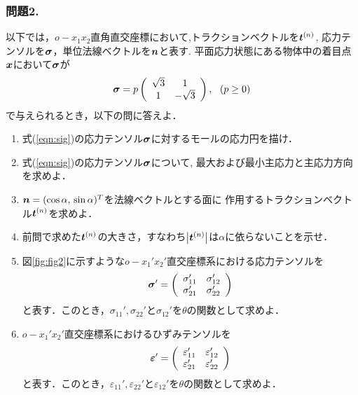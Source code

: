 \documentclass[10pt,a4j]{jarticle}
\begin{document}
\subsubsection*{問題2.}
以下では，$o-x_1x_2$直角直交座標において,トラクションベクトルを$\mbox{\boldmath $t$}^{(n)}$, 
応力テンソルを$\mbox{\boldmath $\sigma$}$，単位法線ベクトルを$\mbox{\boldmath $n$}$と表す.
平面応力状態にある物体中の着目点$\mbox{\boldmath $x$}$において$\mbox{\boldmath $\sigma$}$が
\begin{equation}
	\mbox{\boldmath $\sigma$}=
	p
	\left(
	\begin{array}{cc}
		\sqrt{3} &  1 \\
		1 & -\sqrt{3} 
	\end{array}
	\right), \ \ (p \geq 0)
	\label{eqn:sig}
\end{equation}
で与えられるとき，以下の問に答えよ．
\begin{enumerate}
\item
	式(\ref{eqn:sig})の応力テンソル$\mbox{\boldmath $\sigma$}$に対するモールの応力円を描け．
\item
	式(\ref{eqn:sig})の応力テンソル$\mbox{\boldmath $\sigma$}$について, 最大および最小主応力と主応力方向を求めよ．
\item
	$\mbox{\boldmath $n$}=(\cos\alpha,\, \sin\alpha)^T$を法線ベクトルとする面に
	作用するトラクションベクトル$\mbox{\boldmath $t$}^{(n)}$を求めよ．
\item 
	前問で求めた$\mbox{\boldmath $t$}^{(n)}$の大きさ，すなわち$\left| \mbox{\boldmath $t$}^{(n)}\right|$は$\alpha$に依らないことを示せ．
\item
	図\ref{fig:fig2}に示すような$o-x_1'x_2'$直交座標系における応力テンソルを
	\begin{equation}
	\mbox{\boldmath $\sigma$}'=
	\left(
	\begin{array}{cc}
		\sigma_{11}' &  \sigma_{12}' \\
		\sigma_{21}' &  \sigma_{22}' 
	\end{array}
	\right)
	\label{eqn:sigd}
	\end{equation}
		と表す．このとき，$\sigma_{11}',\sigma_{22}'$と$\sigma_{12}'$を$\theta$の関数として求めよ．
\item
	$o-x_1'x_2'$直交座標系におけるひずみテンソルを
	\begin{equation}
	\mbox{\boldmath $\varepsilon$}'=
	\left(
	\begin{array}{cc}
		\varepsilon_{11}' &  \varepsilon_{12}' \\
		\varepsilon_{21}' &  \varepsilon_{22}' 
	\end{array}
	\right)
	\label{eqn:epsd}
	\end{equation}
	と表す．このとき，$\varepsilon_{11}',\varepsilon_{22}'$と$\varepsilon_{12}'$を$\theta$の関数として求めよ．

\end{enumerate}
\end{document}
